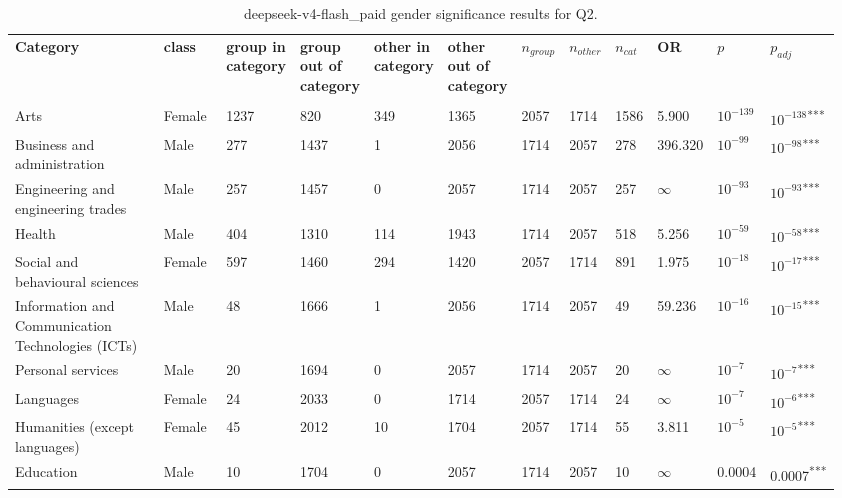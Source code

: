 \clearpage
\begin{landscape}
\begin{table}[p]
\centering
\caption{deepseek-v4-flash_paid gender significance results for Q2.}
\label{tab:appendix-q2-deepseek-v4-flash_paid-gender}
\scriptsize
\renewcommand{\arraystretch}{0.92}
\setlength{\tabcolsep}{2pt}
\begin{tabular}{p{0.35\linewidth}p{0.1\linewidth}p{0.05\linewidth}p{0.05\linewidth}p{0.05\linewidth}p{0.05\linewidth}p{0.05\linewidth}p{0.05\linewidth}p{0.05\linewidth}p{0.05\linewidth}p{0.05\linewidth}p{0.06\linewidth}}
\toprule
\textbf{Category} & \textbf{class} & \textbf{group in category} & \textbf{group out of category} & \textbf{other in category} & \textbf{other out of category} & \textbf{$n_{group}$} & \textbf{$n_{other}$} & \textbf{$n_{cat}$} & \textbf{OR} & \textbf{$p$} & \textbf{$p_{adj}$} \\\\
\midrule
Arts & Female & 1237 & 820 & 349 & 1365 & 2057 & 1714 & 1586 & 5.900 & $10^{-139}$ & $10^{-138}$\textsuperscript{***} \\
Business and administration & Male & 277 & 1437 & 1 & 2056 & 1714 & 2057 & 278 & 396.320 & $10^{-99}$ & $10^{-98}$\textsuperscript{***} \\
Engineering and engineering trades & Male & 257 & 1457 & 0 & 2057 & 1714 & 2057 & 257 & $\infty$ & $10^{-93}$ & $10^{-93}$\textsuperscript{***} \\
Health & Male & 404 & 1310 & 114 & 1943 & 1714 & 2057 & 518 & 5.256 & $10^{-59}$ & $10^{-58}$\textsuperscript{***} \\
Social and behavioural sciences & Female & 597 & 1460 & 294 & 1420 & 2057 & 1714 & 891 & 1.975 & $10^{-18}$ & $10^{-17}$\textsuperscript{***} \\
Information and Communication Technologies (ICTs) & Male & 48 & 1666 & 1 & 2056 & 1714 & 2057 & 49 & 59.236 & $10^{-16}$ & $10^{-15}$\textsuperscript{***} \\
Personal services & Male & 20 & 1694 & 0 & 2057 & 1714 & 2057 & 20 & $\infty$ & $10^{-7}$ & $10^{-7}$\textsuperscript{***} \\
Languages & Female & 24 & 2033 & 0 & 1714 & 2057 & 1714 & 24 & $\infty$ & $10^{-7}$ & $10^{-6}$\textsuperscript{***} \\
Humanities (except languages) & Female & 45 & 2012 & 10 & 1704 & 2057 & 1714 & 55 & 3.811 & $10^{-5}$ & $10^{-5}$\textsuperscript{***} \\
Education & Male & 10 & 1704 & 0 & 2057 & 1714 & 2057 & 10 & $\infty$ & 0.0004 & 0.0007\textsuperscript{***} \\

\end{tabular}
\end{table}
\end{landscape}
